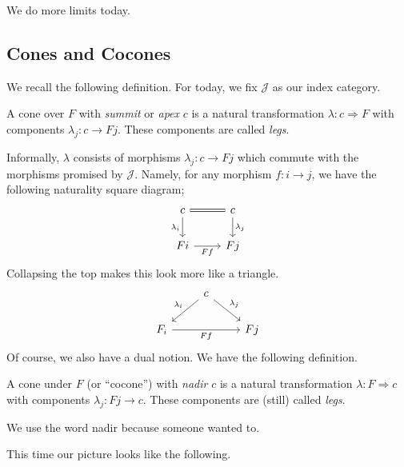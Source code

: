 \documentclass[../notes.tex]{subfiles}
\begin{document}

We do more limits today.

\subsection{Cones and Cocones}
We recall the following definition. For today, we fix $\mathcal J$ as our index category.
\conedef*
\begin{definition}[Apex]
	A cone over $F$ with \textit{summit} or \textit{apex} $c$ is a natural transformation $\lambda:c\Rightarrow F$ with components $\lambda_j:c\to Fj$. These components are called \textit{legs}.
\end{definition}
Informally, $\lambda$ consists of morphisms $\lambda_j:c\to Fj$ which commute with the morphisms promised by $\mathcal J$. Namely, for any morphism $f:i\to j$, we have the following naturality square diagram;
\[\begin{tikzcd}
	c & c \\
	Fi & Fj
	\arrow["Ff"', from=2-1, to=2-2]
	\arrow[Rightarrow, no head, from=1-1, to=1-2]
	\arrow["{\lambda_i}"', from=1-1, to=2-1]
	\arrow["{\lambda_j}", from=1-2, to=2-2]
\end{tikzcd}\]
Collapsing the top makes this look more like a triangle.
\[\begin{tikzcd}
	& c \\
	{F_i} && Fj
	\arrow["{\lambda_j}", from=1-2, to=2-3]
	\arrow["{\lambda_i}"', from=1-2, to=2-1]
	\arrow["Ff"', from=2-1, to=2-3]
\end{tikzcd}\]
Of course, we also have a dual notion. We have the following definition.
\begin{definition}[Nadir]
	A cone under $F$ (or ``cocone'') with \textit{nadir} $c$ is a natural transformation $\lambda:F\Rightarrow c$ with components $\lambda_j:Fj\to c$. These components are (still) called \textit{legs}.
\end{definition}
\begin{remark}
	We use the word nadir because someone wanted to.
\end{remark}
This time our picture looks like the following.
\end{document}
